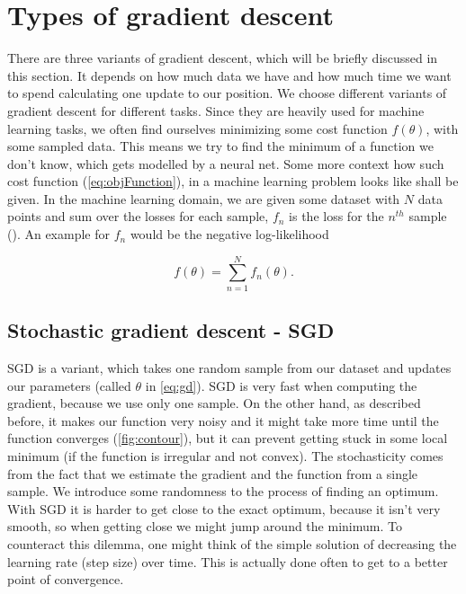 \documentclass[aodsor,preprint]{imsart}
\numberwithin{equation}{section}
\theoremstyle{plain}
\begin{document}
\section{Types of gradient descent}
There are three variants of gradient descent, which will be briefly discussed in this section. It depends on how much data we have and how much time we want to spend calculating one update to our position. We choose different variants of gradient descent for different tasks. Since they are heavily used for machine learning tasks, we often find ourselves minimizing some cost function $f(\theta)$, with some sampled data. This means we try to find the minimum of a function we don't know, which gets modelled by a neural net. Some more context how such cost function (\ref{eq:objFunction}), in a machine learning problem looks like shall be given. In the machine learning domain, we are given some dataset with $N$ data points and sum over the losses for each sample, $f_{n}$ is the loss for the $n^{th}$ sample (\cite{Deisenroth2020}). An example for $f_{n}$ would be the negative log-likelihood

\begin{equation} \label{eq:costFunction}
f(\theta) = \sum_{n=1}^{N} f_{n}(\theta).
\end{equation}


\subsection{Stochastic gradient descent - SGD}
SGD is a variant, which takes one random sample from our dataset and updates our parameters (called $\theta$ in \ref{eq:gd}). SGD is very fast when computing the gradient, because we use only one sample. On the other hand, as described before, it makes our function very noisy and it might take more time until the function converges (\ref{fig:contour}), but it can prevent getting stuck in some local minimum (if the function is irregular and not convex). The stochasticity comes from the fact that we estimate the gradient and the function from a single sample. We introduce some randomness to the process of finding an optimum. With SGD it is harder to get close to the exact optimum, because it isn't very smooth, so when getting close we might jump around the minimum. To counteract this dilemma, one might think of the simple solution of decreasing the learning rate (step size) over time. This is actually done often to get to a better point of convergence.
\end{document}
